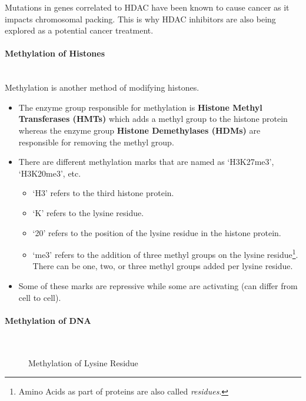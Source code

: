 \documentclass[letterpaper,12pt]{article}
\begin{document}
Mutations in genes correlated to HDAC have been known to cause cancer as it impacts chromosomal packing. This is why HDAC inhibitors are also being explored as a potential cancer treatment.

\paragraph{Methylation of Histones}\mbox{}\\
Methylation is another method of modifying histones.
\begin{itemize}
	\item The enzyme group responsible for methylation is \textbf{Histone Methyl Transferases (HMTs)} which adds a methyl group to the histone protein whereas the enzyme group \textbf{Histone Demethylases (HDMs)} are responsible for removing the methyl group.
	\item There are different methylation marks that are named as `H3K27me3', `H3K20me3', etc.
	      \begin{itemize}
		      \item `H3' refers to the third histone protein.
		      \item `K' refers to the lysine residue.
		      \item `20' refers to the position of the lysine residue in the histone protein.
		      \item `me3' refers to the addition of three methyl groups on the lysine residue\footnote{Amino Acids as part of proteins are also called \textit{residues}.}. There can be one, two, or three methyl groups added per lysine residue.
	      \end{itemize}
	\item Some of these marks are repressive while some are activating (can differ from cell to cell).
\end{itemize}

\paragraph{Methylation of DNA}\mbox{}\\
\begin{figure}[!h]
	\centering
	\caption{Methylation of Lysine Residue}\label{fig:lysine_methylation}
\end{figure}
\end{document}
